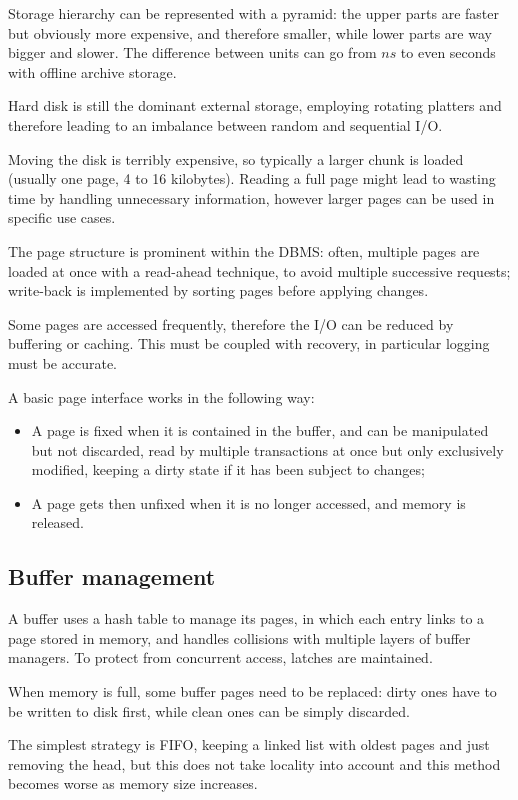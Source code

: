 Storage hierarchy can be represented with a pyramid: the upper parts are faster but obviously more expensive, and therefore smaller, while lower parts are way bigger and slower. The difference between units can go from $ns$ to even seconds with offline archive storage.  

Hard disk is still the dominant external storage, employing rotating platters and therefore leading to an imbalance between random and sequential I/O. 

Moving the disk is terribly expensive, so typically a larger chunk is loaded (usually one page, 4 to 16 kilobytes). Reading a full page might lead to wasting time by handling unnecessary information, however larger pages can be used in specific use cases. 

The page structure is prominent within the DBMS: often, multiple pages are loaded at once with a read-ahead technique, to avoid multiple successive requests; write-back is implemented by sorting pages before applying changes.

Some pages are accessed frequently, therefore the I/O can be reduced by buffering or caching. This must be coupled with recovery, in particular logging must be accurate.

A basic page interface works in the following way:
\begin{itemize}
	\item A page is fixed when it is contained in the buffer, and can be manipulated but not discarded, read by multiple transactions at once but only exclusively modified, keeping a dirty state if it has been subject to changes;
	\item A page gets then unfixed when it is no longer accessed, and memory is released. 
\end{itemize}

\subsection{Buffer management}

A buffer uses a hash table to manage its pages, in which each entry links to a page stored in memory, and handles collisions with multiple layers of buffer managers. To protect from concurrent access, latches are maintained.

When memory is full, some buffer pages need to be replaced: dirty ones have to be written to disk first, while clean ones can be simply discarded. 

The simplest strategy is FIFO, keeping a linked list with oldest pages and just removing the head, but this does not take locality into account and this method becomes worse as memory size increases.

